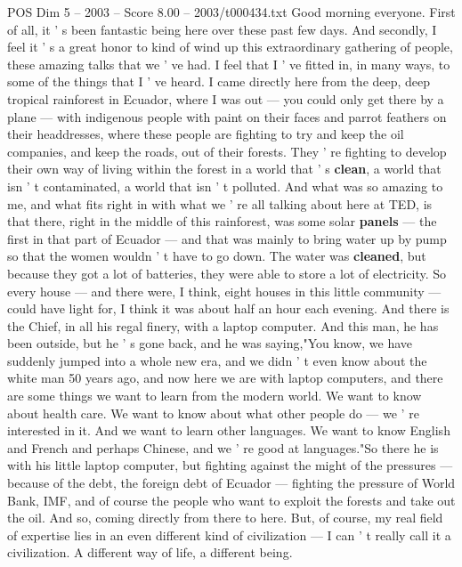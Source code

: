 \begin{textsample}{POS Dim 5 – 2003 – Score 8.00 – 2003/t000434.txt}  \label{ex:f5_pos_022}
Good morning everyone.
First of all, it ' s been fantastic being here over these past few days.
And secondly, I feel it ' s a great honor to kind of wind up this extraordinary gathering of people, these amazing talks that we ' ve had.
I feel that I ' ve fitted in, in many ways, to some of the things that I ' ve heard.
I came directly here from the deep, deep tropical rainforest in Ecuador, where I was out — you could only get there by a plane — with indigenous people with paint on their faces and parrot feathers on their headdresses, where these people are fighting to try and keep the oil companies, and keep the roads, out of their forests.
They ' re fighting to develop their own way of living within the forest in a world that ' s \textbf{clean}, a world that isn ' t contaminated, a world that isn ' t polluted.
And what was so amazing to me, and what fits right in with what we ' re all talking about here at TED, is that there, right in the middle of this rainforest, was some solar \textbf{panels} — the first in that part of Ecuador — and that was mainly to bring water up by pump so that the women wouldn ' t have to go down.
The water was \textbf{cleaned}, but because they got a lot of batteries, they were able to store a lot of electricity.
So every house — and there were, I think, eight houses in this little community — could have light for, I think it was about half an hour each evening.
And there is the Chief, in all his regal finery, with a laptop computer.
And this man, he has been outside, but he ' s gone back, and he was saying,"You know, we have suddenly jumped into a whole new era, and we didn ' t even know about the white man 50 years ago, and now here we are with laptop computers, and there are some things we want to learn from the modern world.
We want to know about health care.
We want to know about what other people do — we ' re interested in it.
And we want to learn other languages.
We want to know English and French and perhaps Chinese, and we ' re good at languages."So there he is with his little laptop computer, but fighting against the might of the pressures — because of the debt, the foreign debt of Ecuador — fighting the pressure of World Bank, IMF, and of course the people who want to exploit the forests and take out the oil.
And so, coming directly from there to here.
But, of course, my real field of expertise lies in an even different kind of civilization — I can ' t really call it a civilization.
A different way of life, a different being.

\end{textsample}
